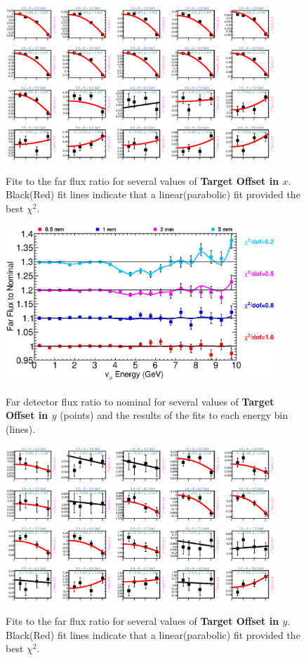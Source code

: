\begin{figure}[hb]
  \begin{center}
    {\includegraphics[width=4.0in]{figures/TargetXOffset_far_fits.eps}}
  \end{center}
\caption{ Fits to the far flux ratio for several values of {\bf Target Offset in $x$}. Black(Red) fit lines indicate that a linear(parabolic) fit provided the best $\chi^2$. }
\end{figure}

\begin{figure}[ht]
  \begin{center}
    {\includegraphics[width=4.0in]{figures/TargetYOffset_far_summary.eps}}
  \end{center}
\caption{ Far detector flux ratio to nominal for several values of {\bf Target Offset in $y$} (points) and the results of the fits to each energy bin (lines).}
\end{figure}

\begin{figure}[hb]
  \begin{center}
    {\includegraphics[width=4.0in]{figures/TargetYOffset_far_fits.eps}}
  \end{center}
\caption{ Fits to the far flux ratio for several values of {\bf Target Offset in $y$}. Black(Red) fit lines indicate that a linear(parabolic) fit provided the best $\chi^2$. }
\end{figure}

